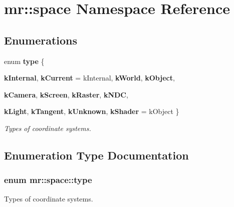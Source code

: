 \section{mr::space Namespace Reference}
\label{namespacemr_1_1space}


\subsection*{Enumerations}
\begin{CompactItemize}
\item 
enum {\bf type} \{ \par
{\bf k\-Internal}, 
{\bf k\-Current} =  k\-Internal, 
{\bf k\-World}, 
{\bf k\-Object}, 
\par
{\bf k\-Camera}, 
{\bf k\-Screen}, 
{\bf k\-Raster}, 
{\bf k\-NDC}, 
\par
{\bf k\-Light}, 
{\bf k\-Tangent}, 
{\bf k\-Unknown}, 
{\bf k\-Shader} =  k\-Object
 \}
\begin{CompactList}\small\item\em Types of coordinate systems. \item\end{CompactList}\end{CompactItemize}


\subsection{Enumeration Type Documentation}
\subsubsection{\setlength{\rightskip}{0pt plus 5cm}enum {\bf mr::space::type}}\label{namespacemr_1_1space_a12}


Types of coordinate systems. 

